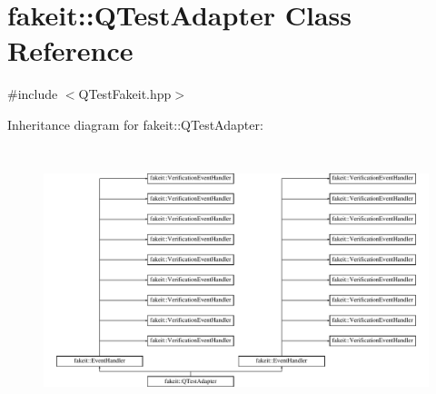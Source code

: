 \hypertarget{classfakeit_1_1QTestAdapter}{}\section{fakeit\+::Q\+Test\+Adapter Class Reference}
\label{classfakeit_1_1QTestAdapter}


{\ttfamily \#include $<$Q\+Test\+Fakeit.\+hpp$>$}

Inheritance diagram for fakeit\+::Q\+Test\+Adapter\+:\begin{figure}[H]
\begin{center}
\leavevmode
\includegraphics[height=7.777778cm]{classfakeit_1_1QTestAdapter}
\end{center}
\end{figure}
